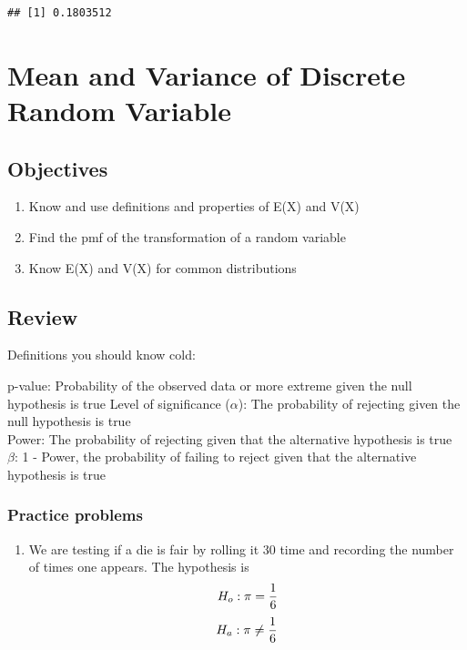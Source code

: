 \documentclass[]{book}
\providecommand{\tightlist}{%
  \setlength{\itemsep}{0pt}\setlength{\parskip}{0pt}}
\theoremstyle{definition}
\theoremstyle{definition}
\theoremstyle{definition}
\theoremstyle{remark}
\begin{document}
\begin{verbatim}
## [1] 0.1803512
\end{verbatim}

\hypertarget{L9}{\section{Mean and Variance of Discrete Random
Variable}\label{L9}}

\subsection{Objectives}\label{objectives-8}

\begin{enumerate}
\def\labelenumi{\arabic{enumi}.}
\tightlist
\item
  Know and use definitions and properties of E(X) and V(X)\\
\item
  Find the pmf of the transformation of a random variable\\
\item
  Know E(X) and V(X) for common distributions
\end{enumerate}

\subsection{Review}\label{review}

Definitions you should know cold:

p-value: Probability of the observed data or more extreme given the null
hypothesis is true Level of significance (\(\alpha\)): The probability
of rejecting given the null hypothesis is true\\
Power: The probability of rejecting given that the alternative
hypothesis is true\\
\(\beta\): 1 - Power, the probability of failing to reject given that
the alternative hypothesis is true

\subsubsection{Practice problems}\label{practice-problems}

\begin{enumerate}
\def\labelenumi{\arabic{enumi}.}
\tightlist
\item
  We are testing if a die is fair by rolling it 30 time and recording
  the number of times one appears. The hypothesis is
  \[H_{o}:\pi={1 \over 6}\] \[H_{a}:\pi \neq {1 \over 6}\]
\end{enumerate}
\end{document}
